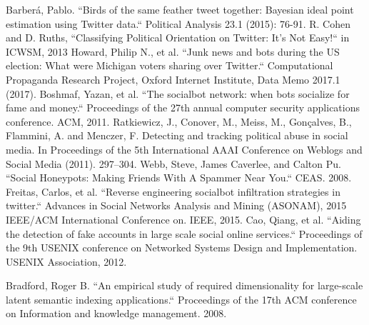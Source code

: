 \begin{thebibliography}{200}
 Barberá, Pablo. ``Birds of the same feather tweet together: Bayesian ideal point estimation using Twitter data.`` Political Analysis 23.1 (2015): 76-91.\label{appendix:6.15}
 R. Cohen and D. Ruths, ``Classifying Political Orientation on Twitter: It’s Not Easy!`` in ICWSM, 2013\label{appendix:6.16}
 Howard, Philip N., et al. ``Junk news and bots during the US election: What were Michigan voters sharing over Twitter.`` Computational Propaganda Research Project, Oxford Internet Institute, Data Memo 2017.1 (2017).\label{appendix:6.17}
 Boshmaf, Yazan, et al. ``The socialbot network: when bots socialize for fame and money.`` Proceedings of the 27th annual computer security applications conference. ACM, 2011.\label{appendix:6.18}
 Ratkiewicz, J., Conover, M., Meiss, M., Gonçalves, B., Flammini, A. and Menczer, F. Detecting and tracking political abuse in social media. In Proceedings of the 5th International AAAI Conference on Weblogs and Social Media (2011). 297–304.\label{appendix:6.20}
 Webb, Steve, James Caverlee, and Calton Pu. ``Social Honeypots: Making Friends With A Spammer Near You.`` CEAS. 2008.\label{appendix:6.22}
 Freitas, Carlos, et al. ``Reverse engineering socialbot infiltration strategies in twitter.`` Advances in Social Networks Analysis and Mining (ASONAM), 2015 IEEE/ACM International Conference on. IEEE, 2015.\label{appendix:6.23}
 Cao, Qiang, et al. ``Aiding the detection of fake accounts in large scale social online services.`` Proceedings of the 9th USENIX conference on Networked Systems Design and Implementation. USENIX Association, 2012.\label{appendix:6.24}


 Bradford, Roger B. ``An empirical study of required dimensionality for large-scale latent semantic indexing applications.`` Proceedings of the 17th ACM conference on Information and knowledge management. 2008.\label{appendix:7.1}

\fi
\end{thebibliography}